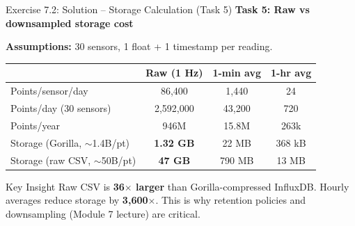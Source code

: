 \documentclass[aspectratio=169,11pt]{beamer}
\begin{document}
\begin{frame}{Exercise 7.2: Solution -- Storage Calculation (Task 5)}
    \textbf{Task 5: Raw vs downsampled storage cost}

    \vspace{0.2cm}
    \textbf{Assumptions:} 30 sensors, 1 float + 1 timestamp per reading.

    \vspace{0.1cm}
    \begin{center}
    \begin{tabular}{lccc}
        \toprule
        & \textbf{Raw (1 Hz)} & \textbf{1-min avg} & \textbf{1-hr avg} \\
        \midrule
        Points/sensor/day & 86,400 & 1,440 & 24 \\
        Points/day (30 sensors) & 2,592,000 & 43,200 & 720 \\
        Points/year & 946M & 15.8M & 263k \\
        Storage (Gorilla, $\sim$1.4B/pt) & \textbf{1.32 GB} & 22 MB & 368 kB \\
        Storage (raw CSV, $\sim$50B/pt) & \textbf{47 GB} & 790 MB & 13 MB \\
        \bottomrule
    \end{tabular}
    \end{center}

    \vspace{0.2cm}
    \begin{alertblock}{Key Insight}
        Raw CSV is \textbf{36$\times$ larger} than Gorilla-compressed InfluxDB. Hourly averages reduce storage by \textbf{3,600$\times$}. This is why retention policies and downsampling (Module 7 lecture) are critical.
    \end{alertblock}
\end{frame}
\end{document}
